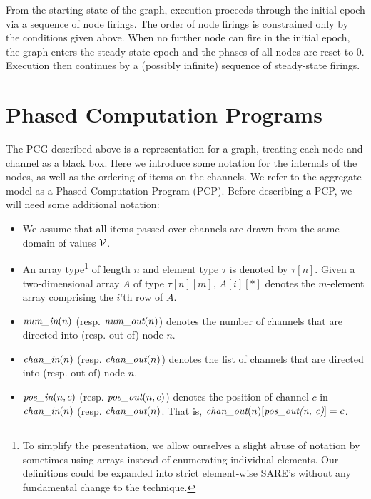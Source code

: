 From the starting state of the graph, execution proceeds through the
initial epoch via a sequence of node firings.  The order of node
firings is constrained only by the conditions given above.  When no
further node can fire in the initial epoch, the graph enters the
steady state epoch and the phases of all nodes are reset to 0.
Execution then continues by a (possibly infinite) sequence of
steady-state firings.

\section{Phased Computation Programs}

The PCG described above is a representation for a graph, treating each
node and channel as a black box.  Here we introduce some notation for
the internals of the nodes, as well as the ordering of items on the
channels.  We refer to the aggregate model as a Phased Computation
Program (PCP).  Before describing a PCP, we will need some additional
notation:
\begin{itemize}

\item We assume that all items passed over channels are drawn from the
same domain of values ${\cal V}$.

\item An array type\footnote{To simplify the presentation, we allow
ourselves a slight abuse of notation by sometimes using arrays instead
of enumerating individual elements.  Our definitions could be expanded
into strict element-wise SARE's without any fundamental change to the
technique.} of length $n$ and element type $\tau$ is denoted by
$\tau[n]$.  Given a two-dimensional array $A$ of type $\tau[n][m]$,
$A[i][*]$ denotes the $m$-element array comprising the $i$'th row of
$A$.

\item $\mbox{\it num\_in}(n)$ (resp. $\mbox{\it num\_out}(n)$) denotes the number of
channels that are directed into (resp. out of) node $n$.

\item $\mbox{\it chan\_in}(n)$ (resp. $\mbox{\it chan\_out}(n)$) denotes the list of
channels that are directed into (resp. out of) node $n$.

\item $\mbox{\it pos\_in}(n, c)$ (resp. $\mbox{\it pos\_out}(n, c)$) denotes the
position of channel $c$ in $\mbox{\it chan\_in}(n)$
(resp. $\mbox{\it chan\_out}(n)$.  That is, $\mbox{\it chan\_out}(n)[\mbox{\it pos\_out(n,
c)}] = c$.

\end{itemize}

